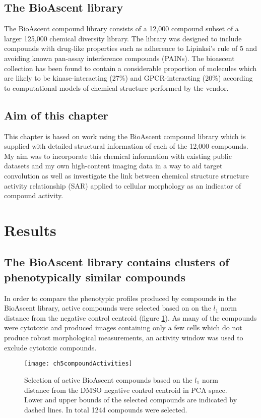 \documentclass[a4paper,11pt,twoside,openright]{scrbook}
\begin{document}
\subsection{The BioAscent library}
The BioAscent compound library consists of a 12,000 compound subset of a larger 125,000 chemical diversity library.
The library was designed to include compounds with drug-like properties such as adherence to Lipinksi's rule of 5 and 
avoiding known pan-assay interference compounds (PAINs).
The bioascent collection has been found to contain a considerable proportion of molecules which are likely to be 
kinase-interacting (27\%) and GPCR-interacting (20\%) according to computational models of chemical structure performed 
by the vendor.


\subsection{Aim of this chapter}
This chapter is based on work using the BioAscent compound library which is supplied with detailed structural 
information of each of the 12,000 compounds.
My aim was to incorporate this chemical information with existing public datasets and my own high-content imaging data 
in a way to aid target convolution as well as investigate the link between chemical structure structure activity 
relationship (SAR) applied to cellular morphology as an indicator of compound activity.




\section{Results}

\subsection{The BioAscent library contains clusters of phenotypically similar compounds}

In order to compare the phenotypic profiles produced by compounds in the BioAscent library, active compounds were 
selected based on on the $l_1$ norm distance from the negative control centroid (figure \ref{figure:compound_activity}).
As many of the compounds were cytotoxic and produced images containing only a few cells which do not produce robust 
morphological measurements, an activity window was used to exclude cytotoxic compounds.


\begin{figure}
    \captionsetup{width=0.8\textwidth}
    \caption[Selecting active compounds based on distance]{
Selection of active BioAscent compounds based on the $l_1$ norm distance from the DMSO negative control centroid in PCA 
space.
Lower and upper bounds of the selected compounds are indicated by dashed lines. In total 1244 compounds were selected.}
    \texttt{[image: ch5compoundActivities]}
    \label{figure:compound_activity}
\end{figure}
\end{document}
